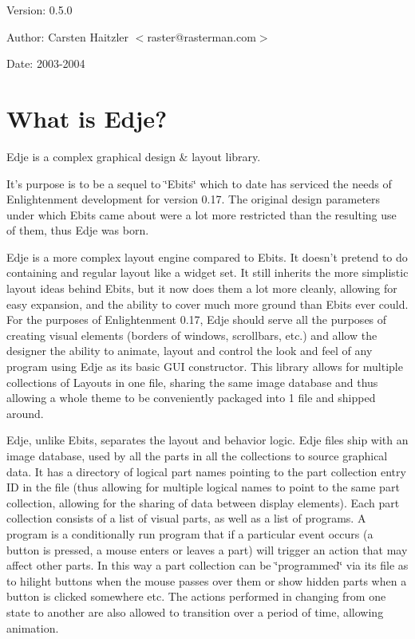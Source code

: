  \begin{Desc}
\item[Version:]0.5.0 \end{Desc}
\begin{Desc}
\item[Author:]Carsten Haitzler $<$raster@rasterman.com$>$ \end{Desc}
\begin{Desc}
\item[Date:]2003-2004\end{Desc}
\hypertarget{index_intro}{}\section{What is Edje?}\label{index_intro}
Edje is a complex graphical design \& layout library.

It's purpose is to be a sequel to \char`\"{}Ebits\char`\"{} which to date has serviced the needs of Enlightenment development for version 0.17. The original design parameters under which Ebits came about were a lot more restricted than the resulting use of them, thus Edje was born.

Edje is a more complex layout engine compared to Ebits. It doesn't pretend to do containing and regular layout like a widget set. It still inherits the more simplistic layout ideas behind Ebits, but it now does them a lot more cleanly, allowing for easy expansion, and the ability to cover much more ground than Ebits ever could. For the purposes of Enlightenment 0.17, Edje should serve all the purposes of creating visual elements (borders of windows, scrollbars, etc.) and allow the designer the ability to animate, layout and control the look and feel of any program using Edje as its basic GUI constructor. This library allows for multiple collections of Layouts in one file, sharing the same image database and thus allowing a whole theme to be conveniently packaged into 1 file and shipped around.

Edje, unlike Ebits, separates the layout and behavior logic. Edje files ship with an image database, used by all the parts in all the collections to source graphical data. It has a directory of logical part names pointing to the part collection entry ID in the file (thus allowing for multiple logical names to point to the same part collection, allowing for the sharing of data between display elements). Each part collection consists of a list of visual parts, as well as a list of programs. A program is a conditionally run program that if a particular event occurs (a button is pressed, a mouse enters or leaves a part) will trigger an action that may affect other parts. In this way a part collection can be \char`\"{}programmed\char`\"{} via its file as to hilight buttons when the mouse passes over them or show hidden parts when a button is clicked somewhere etc. The actions performed in changing from one state to another are also allowed to transition over a period of time, allowing animation.

